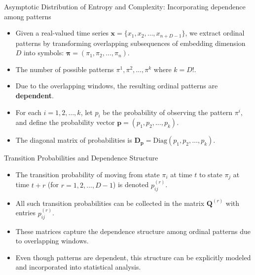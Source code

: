 \documentclass{beamer}
\begin{document}
	

\begin{frame}{Asymptotic Distribution of Entropy and Complexity: Incorporating dependence among patterns}
	\begin{itemize}
		\item Given a real-valued time series $\mathbf{x} = \{x_1, x_2, \ldots, x_{n+D-1}\}$, we extract ordinal patterns by transforming overlapping subsequences of embedding dimension $D$ into symbols: $\mathbf{\pi} = (\pi_1, \pi_2, \ldots, \pi_n)$.
		\item The number of possible patterns $\pi^1, \pi^2, \ldots, \pi^k$ where $k = D!$.
		\item Due to the overlapping windows, the resulting ordinal patterns are \textbf{dependent}.
		\item For each $i = 1, 2, \ldots, k$, let $p_i$ be the probability of observing the pattern $\pi^i$, and define the probability vector $\mathbf{p} = (p_1, p_2, \ldots, p_k)$.
		\item The diagonal matrix of probabilities is $\mathbf{D_p} = \text{Diag}(p_1, p_2, \ldots, p_k)$.
	\end{itemize}
\end{frame}

\begin{frame}{Transition Probabilities and Dependence Structure}
	\begin{itemize}
		\item The transition probability of moving from state $\pi_i$ at time $t$ to state $\pi_j$ at time $t+r$ (for $r = 1, 2, \ldots, D-1$) is denoted $p^{(r)}_{ij}$.
		\item All such transition probabilities can be collected in the matrix $\mathbf{Q}^{(r)}$ with entries $p^{(r)}_{ij}$.
		\item These matrices capture the dependence structure among ordinal patterns due to overlapping windows.
		\item Even though patterns are dependent, this structure can be explicitly modeled and incorporated into statistical analysis.
	\end{itemize}
\end{frame}
\end{document}
